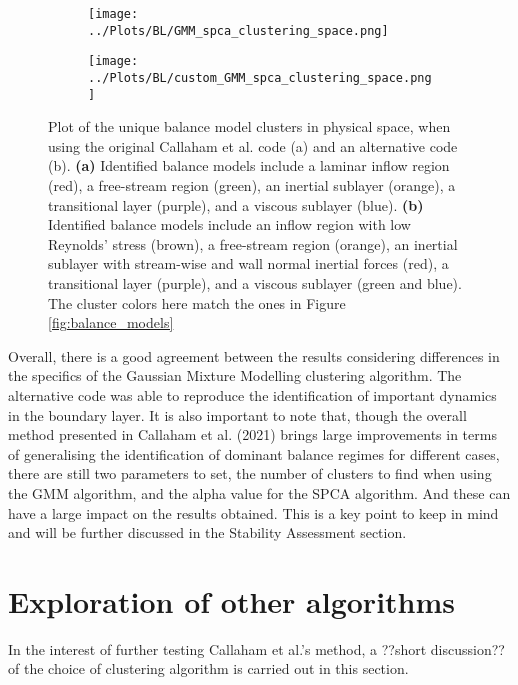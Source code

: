 \documentclass[12pt]{report} %
\begin{document}
\begin{figure}[htbp]
  \centering
  \begin{subfigure}[b]{0.7\textwidth}
      \texttt{[image: ../Plots/BL/GMM\_spca\_clustering\_space.png]}
      \caption{}
  \end{subfigure}
  \begin{subfigure}[b]{0.7\textwidth}
      \texttt{[image: ../Plots/BL/custom\_GMM\_spca\_clustering\_space.png]}
      \caption{}
  \end{subfigure}
  \caption{Plot of the unique balance model clusters in physical space, when using the original Callaham et al. code (a) and an alternative code (b). \textbf{(a)} Identified balance models include a laminar inflow region (red), a free-stream region (green), an inertial sublayer (orange), a transitional layer (purple), and a viscous sublayer (blue). \textbf{(b)} Identified balance models include an inflow region with low Reynolds' stress (brown), a free-stream region (orange), an inertial sublayer with stream-wise and wall normal inertial forces (red), a transitional layer (purple), and a viscous sublayer (green and blue). The cluster colors here match the ones in Figure \ref{fig:balance_models}}
  \label{fig:balance_model_clusters}
\end{figure}

Overall, there is a good agreement between the results considering differences in the specifics of the Gaussian Mixture Modelling clustering algorithm. The alternative code was able to reproduce the identification of important dynamics in the boundary layer. It is also important to note that, though the overall method presented in Callaham et al. (2021)\cite{callaham2021learning} brings large improvements in terms of generalising the identification of dominant balance regimes for different cases, there are still two parameters to set, the number of clusters to find when using the GMM algorithm, and the alpha value for the SPCA algorithm. And these can have a large impact on the results obtained. This is a key point to keep in mind and will be further discussed in the Stability Assessment section.


\section{Exploration of other algorithms}

In the interest of further testing Callaham et al.'s method, a ??short discussion?? of the choice of clustering algorithm is carried out in this section.
\end{document}
